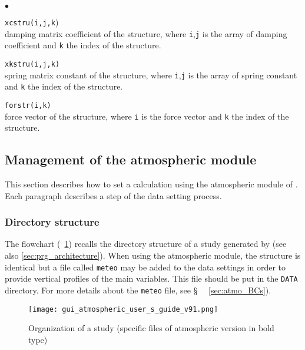 {{\begin{list}{$\bullet$}{}
\item{\texttt{xcstru(i,j,k})}\\
{damping matrix coefficient of the structure, where \texttt{i},\texttt{j} is the array of
damping coefficient and \texttt{k} the index of the structure.}

\item{\texttt{xkstru(i,j,k)}}\\
{spring matrix constant of the structure, where \texttt{i},\texttt{j} is the array of spring
constant and \texttt{k} the index of the structure.}

\item{\texttt{forstr(i,k)}}\\
{force vector of the structure, where \texttt{i} is the force vector and
\texttt{k} the index of the structure.}
\end{list}

\subsection{Management of the atmospheric module}

This section describes how to set a calculation using the atmospheric module
of \CS. Each paragraph describes a step of the data setting process.

\subsubsection{Directory structure}\label{sec:atmo_struct}
%
The flowchart (\figurename~\ref{fig:organisation}) recalls the directory
structure of a study generated by \CS (see also \ref{sec:prg_architecture}).
When using the atmospheric module, the structure is identical but a file called
\texttt{meteo} may be added to the data settings in order to provide vertical
profiles of the main variables. This file should be put in the \texttt{DATA}
directory. For more details about the \texttt{meteo} file, see \S~
~\ref{sec:atmo_BCs}).
%
\begin{figure}[ht]
 \centerline{\texttt{[image: gui\_atmospheric\_user\_s\_guide\_v91.png]}}
 \caption{Organization of a study (specific files of atmospheric version in bold type)}
 \label{fig:organisation}
\end{figure}
%
}}
